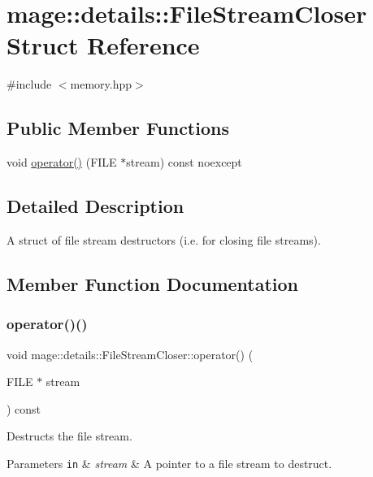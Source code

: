\hypertarget{structmage_1_1details_1_1_file_stream_closer}{}\section{mage\+:\+:details\+:\+:File\+Stream\+Closer Struct Reference}
\label{structmage_1_1details_1_1_file_stream_closer}


{\ttfamily \#include $<$memory.\+hpp$>$}

\subsection*{Public Member Functions}
\begin{DoxyCompactItemize}
\item 
void \mbox{\hyperlink{structmage_1_1details_1_1_file_stream_closer_a4863cbec79a58a2aaf4d04ccd8d8d9d0}{operator()}} (F\+I\+LE $\ast$stream) const noexcept
\end{DoxyCompactItemize}


\subsection{Detailed Description}
A struct of file stream destructors (i.\+e. for closing file streams). 

\subsection{Member Function Documentation}
\mbox{\label{structmage_1_1details_1_1_file_stream_closer_a4863cbec79a58a2aaf4d04ccd8d8d9d0}} 
\subsubsection{\texorpdfstring{operator()()}{operator()()}}
{\footnotesize\ttfamily void mage\+::details\+::\+File\+Stream\+Closer\+::operator() (\begin{DoxyParamCaption}\item[{F\+I\+LE $\ast$}]{stream }\end{DoxyParamCaption}) const\hspace{0.3cm}{\ttfamily [noexcept]}}

Destructs the file stream.


\begin{DoxyParams}[1]{Parameters}
\mbox{\tt in}  & {\em stream} & A pointer to a file stream to destruct. \\
\hline
\end{DoxyParams}

